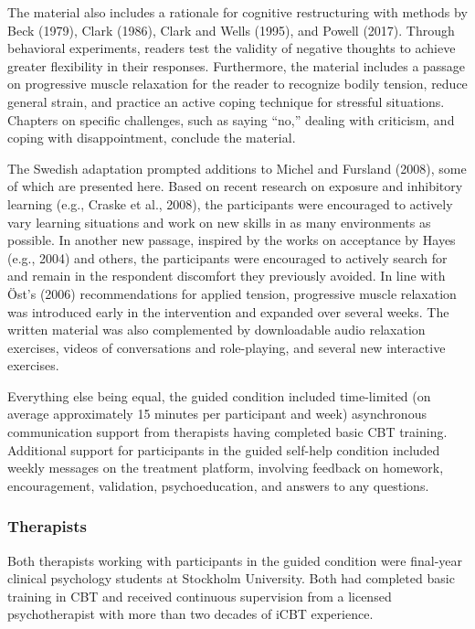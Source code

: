 \documentclass[3p]{elsarticle} %
\begin{document}
The material also includes a rationale for cognitive restructuring with
methods by Beck (1979), Clark (1986), Clark and Wells (1995), and Powell
(2017). Through behavioral experiments, readers test the validity of
negative thoughts to achieve greater flexibility in their responses.
Furthermore, the material includes a passage on progressive muscle
relaxation for the reader to recognize bodily tension, reduce general
strain, and practice an active coping technique for stressful
situations. Chapters on specific challenges, such as saying ``no,''
dealing with criticism, and coping with disappointment, conclude the
material.

The Swedish adaptation prompted additions to Michel and Fursland (2008),
some of which are presented here. Based on recent research on exposure
and inhibitory learning (e.g., Craske et al., 2008), the participants
were encouraged to actively vary learning situations and work on new
skills in as many environments as possible. In another new passage,
inspired by the works on acceptance by Hayes (e.g., 2004) and others,
the participants were encouraged to actively search for and remain in
the respondent discomfort they previously avoided. In line with Öst's
(2006) recommendations for applied tension, progressive muscle
relaxation was introduced early in the intervention and expanded over
several weeks. The written material was also complemented by
downloadable audio relaxation exercises, videos of conversations and
role-playing, and several new interactive exercises.

Everything else being equal, the guided condition included time-limited
(on average approximately 15 minutes per participant and week)
asynchronous communication support from therapists having completed
basic CBT training. Additional support for participants in the guided
self-help condition included weekly messages on the treatment platform,
involving feedback on homework, encouragement, validation,
psychoeducation, and answers to any questions.

\hypertarget{therapists}{%
\subsubsection{Therapists}\label{therapists}}

Both therapists working with participants in the guided condition were
final-year clinical psychology students at Stockholm University. Both
had completed basic training in CBT and received continuous supervision
from a licensed psychotherapist with more than two decades of iCBT
experience.
\end{document}
